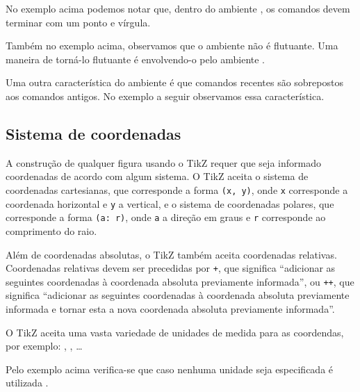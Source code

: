 No exemplo acima podemos notar que, dentro do ambiente , os comandos devem terminar com um ponto e v\'{i}rgula.

Tamb\'{e}m no exemplo acima, observamos que o ambiente  n\~{a}o \'{e} flutuante. Uma maneira de torn\'{a}-lo flutuante \'{e} envolvendo-o pelo ambiente .

Uma outra caracter\'{i}stica do ambiente  \'{e} que comandos recentes s\~{a}o sobrepostos aos comandos antigos. No exemplo a seguir observamos essa caracter\'{i}stica. \\

\subsection{Sistema de coordenadas}
A constru\c{c}\~{a}o de qualquer figura usando o TikZ requer que seja informado coordenadas de acordo com algum sistema. O TikZ aceita o sistema de coordenadas cartesianas, que corresponde a forma \lstinline!(x, y)!, onde \lstinline!x! corresponde a coordenada horizontal e \lstinline!y! a vertical, e o sistema de coordenadas polares, que corresponde a forma \lstinline!(a: r)!, onde \lstinline!a! a dire\c{c}\~{a}o em graus e \lstinline!r! corresponde ao comprimento do raio. \\

Al\'{e}m de coordenadas absolutas, o TikZ tamb\'{e}m aceita coordenadas relativas. Coordenadas relativas devem ser precedidas por \lstinline!+!, que significa ``adicionar as seguintes coordenadas \`{a} coordenada absoluta previamente informada'', ou \lstinline!++!, que significa ``adicionar as seguintes coordenadas \`{a} coordenada absoluta previamente informada e tornar esta a nova coordenada absoluta previamente informada''. \\

O TikZ aceita uma vasta variedade de unidades de medida para as coordendas, por exemplo: , ,  \ldots \\

Pelo exemplo acima verifica-se que caso nenhuma unidade seja especificada \'{e} utilizada .

